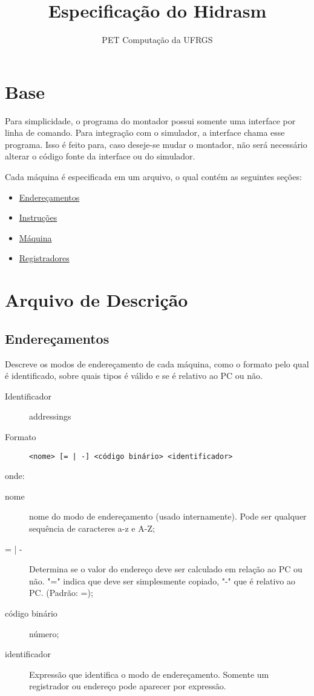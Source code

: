 \documentclass[a4paper,10pt]{article}
\title{Especificação do Hidrasm}
\author{PET Computação da UFRGS}
\newcommand{\Enderecamentos} {\hyperref[endereçamentos]{Endereçamentos}}
\newcommand{\Instrucoes} {\hyperref[instruções]{Instruções}}
\newcommand{\Maquina} {\hyperref[máquina] {Máquina}}
\newcommand{\Registradores} {\hyperref[registradores] {Registradores}}
\begin{document}
\maketitle

\tableofcontents

\section{Base}
Para simplicidade, o programa do montador possui somente uma interface por linha de comando. Para integração com o simulador, a interface chama esse programa. Isso é feito para, caso deseje-se mudar o montador, não será necessário alterar o código fonte da interface ou do simulador.

Cada máquina é especificada em um arquivo, o qual contém as seguintes seções:
\begin{itemize}
 \item \Enderecamentos
 \item \Instrucoes
 \item \Maquina
 \item \Registradores
\end{itemize}

\section{Arquivo de Descrição}

	\subsection{Endereçamentos}
		\label{endereçamentos}
		Descreve os modos de endereçamento de cada máquina, como o formato pelo qual é identificado, sobre quais tipos é válido e se é relativo ao PC ou não.
		
		\begin{description}
		 \item [Identificador] addressings
		 \item [Formato] \verb+<nome> [= | -] <código binário> <identificador> +
		\end{description}
		onde:
		\begin{description}
		 \item [nome] nome do modo de endereçamento (usado internamente). Pode ser qualquer sequência de caracteres a-z e A-Z;
		 \item [= | -] Determina se o valor do endereço deve ser calculado em relação ao PC ou não. "=" indica que deve ser simplesmente copiado, "-" que é relativo ao PC. (Padrão: =);
		 \item [código binário] número;
		 \item [identificador] Expressão que identifica o modo de endereçamento. Somente um registrador ou endereço pode aparecer por expressão.
		\end{description}
\end{document}
